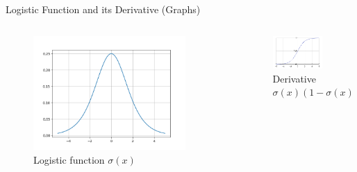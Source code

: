 \documentclass{beamer} %
\begin{document}
\begin{frame}{Logistic Function and its Derivative (Graphs)}
  \begin{columns}[T] %
    \begin{column}{0.5\textwidth}
      \begin{figure}
        \centering
        \includegraphics[width=0.9\textwidth]{p1.3.png} %
        \caption{Logistic function $\sigma(x)$}
      \end{figure}
    \end{column}
    \begin{column}{0.5\textwidth}
      \begin{figure}
        \centering
        \includegraphics[width=0.9\textwidth]{p1.4.png} %
        \caption{Derivative $\sigma(x)(1-\sigma(x))$}
      \end{figure}
    \end{column}
  \end{columns}
\end{frame}
\end{document}
